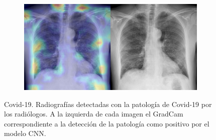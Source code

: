 \begin{figure}[b]
\begin{subfigure}{0.4\textwidth}
    \end{subfigure}
    \begin{subfigure}{0.4\textwidth}
        \centering
        \includegraphics[width=1.0\textwidth]{Chapters/5. Conclusiones/img/COVID-19/1_1_covid-19-pneumonia-20-pa-on-admission.jpg}
    \end{subfigure}

    \caption{Covid-19. Radiografías detectadas con la patología de Covid-19 por los
                    radiólogos. A la izquierda de cada imagen el GradCam correspondiente a la detección
                    de la patología como positivo por el modelo CNN.}
\end{figure}

